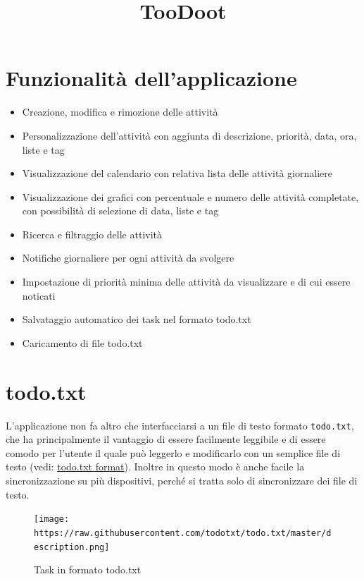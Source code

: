 \documentclass[]{article}
\title{TooDoot}
\date{}
\providecommand{\tightlist}{%
  \setlength{\itemsep}{0pt}\setlength{\parskip}{0pt}}
\begin{document}
\maketitle

\hypertarget{funzionalitaux300-dellapplicazione}{%
\section{Funzionalità
dell'applicazione}\label{funzionalitaux300-dellapplicazione}}

\begin{itemize}
\tightlist
\item
  Creazione, modifica e rimozione delle attività
\item
  Personalizzazione dell'attività con aggiunta di descrizione, priorità,
  data, ora, liste e tag
\item
  Visualizzazione del calendario con relativa lista delle attività
  giornaliere
\item
  Visualizzazione dei grafici con percentuale e numero delle attività
  completate, con possibilità di selezione di data, liste e tag
\item
  Ricerca e filtraggio delle attività
\item
  Notifiche giornaliere per ogni attività da svolgere
\item
  Impostazione di priorità minima delle attività da visualizzare e di
  cui essere noticati
\item
  Salvataggio automatico dei task nel formato todo.txt
\item
  Caricamento di file todo.txt
\end{itemize}

\hypertarget{todo.txt}{%
\section{todo.txt}\label{todo.txt}}

L'applicazione non fa altro che interfacciarsi a un file di testo
formato \texttt{todo.txt}, che ha principalmente il vantaggio di essere
facilmente leggibile e di essere comodo per l'utente il quale può
leggerlo e modificarlo con un semplice file di testo (vedi:
\href{https://github.com/todotxt/todo.txt}{todo.txt format}). Inoltre in
questo modo è anche facile la sincronizzazione su più dispositivi,
perché si tratta solo di sincronizzare dei file di testo.

\begin{figure}
\centering
\texttt{[image: https://raw.githubusercontent.com/todotxt/todo.txt/master/description.png]}
\caption{Task in formato todo.txt}
\end{figure}
\end{document}

